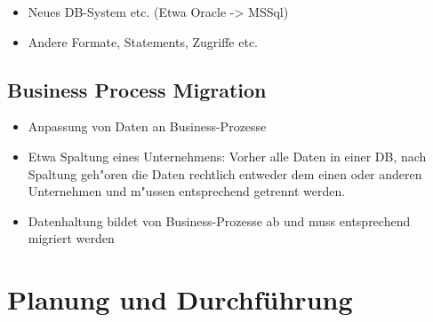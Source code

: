 \documentclass[11pt]{scrartcl}
\begin{document}
\begin{itemize}
	\item Neues DB-System etc. (Etwa Oracle -> MSSql)
	\item Andere Formate, Statements, Zugriffe etc.
\end{itemize}

\subsection{Business Process Migration}

\begin{itemize}
	\item Anpassung von Daten an Business-Prozesse
	\item Etwa Spaltung eines Unternehmens: Vorher alle Daten in einer DB, nach Spaltung geh"oren die Daten rechtlich entweder dem einen oder anderen Unternehmen und m"ussen entsprechend getrennt werden.
	\item Datenhaltung bildet von Business-Prozesse ab und muss entsprechend migriert werden
\end{itemize}

\section{Planung und Durchführung}			%
\end{document}
